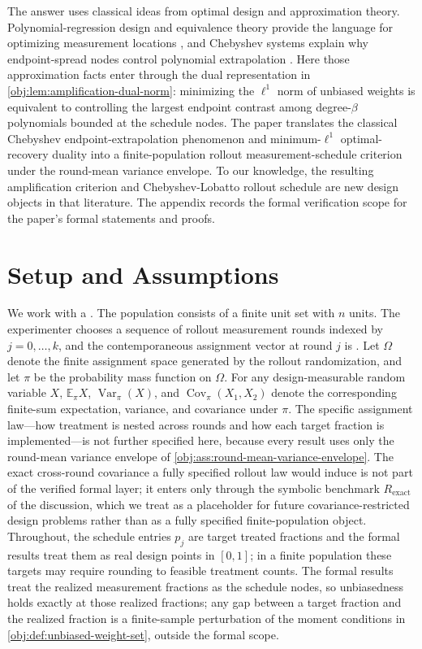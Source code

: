 \documentclass[11pt]{article}
\begin{document}
The answer uses classical ideas from optimal design and approximation theory. Polynomial-regression design and equivalence theory provide the language for optimizing measurement locations \citep{smith1918,kiefer1959,kiefer1974,pukelsheim1993}, and Chebyshev systems explain why endpoint-spread nodes control polynomial extrapolation \citep{karlin1966}. Here those approximation facts enter through the dual representation in \cref{obj:lem:amplification-dual-norm}: minimizing the \(\ell^1\) norm of unbiased weights is equivalent to controlling the largest endpoint contrast among degree-\(\beta\) polynomials bounded at the schedule nodes. The paper translates the classical Chebyshev endpoint-extrapolation phenomenon and minimum-\(\ell^1\) optimal-recovery duality into a finite-population rollout measurement-schedule criterion under the round-mean variance envelope. To our knowledge, the resulting amplification criterion and Chebyshev-Lobatto rollout schedule are new design objects in that literature. The appendix records the formal verification scope for the paper's formal statements and proofs.


\section{Setup and Assumptions}

We work with a . The population consists of a finite unit set  with \(n\) units. The experimenter chooses a sequence of rollout measurement rounds indexed by \(j=0,\ldots,k\), and the contemporaneous assignment vector at round \(j\) is . Let \(\Omega\) denote the finite assignment space generated by the rollout randomization, and let \(\pi\) be the probability mass function on \(\Omega\). For any design-measurable random variable \(X\), \(\mathbb E_\pi X\), \(\operatorname{Var}_\pi(X)\), and \(\operatorname{Cov}_\pi(X_1,X_2)\) denote the corresponding finite-sum expectation, variance, and covariance under \(\pi\). The specific assignment law---how treatment is nested across rounds and how each target fraction is implemented---is not further specified here, because every result uses only the round-mean variance envelope of \cref{obj:ass:round-mean-variance-envelope}. The exact cross-round covariance a fully specified rollout law would induce is not part of the verified formal layer; it enters only through the symbolic benchmark \(R_{\mathrm{exact}}\) of the discussion, which we treat as a placeholder for future covariance-restricted design problems rather than as a fully specified finite-population object. Throughout, the schedule entries \(p_j\) are target treated fractions and the formal results treat them as real design points in \([0,1]\); in a finite population these targets may require rounding to feasible treatment counts. The formal results treat the realized measurement fractions as the schedule nodes, so unbiasedness holds exactly at those realized fractions; any gap between a target fraction and the realized fraction is a finite-sample perturbation of the moment conditions in \cref{obj:def:unbiased-weight-set}, outside the formal scope.
\end{document}
